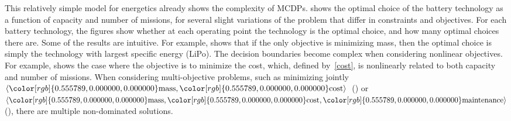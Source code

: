 \documentclass[twocolumn,english]{IEEEtran}
\theoremstyle{definition}
\theoremstyle{plain}
\theoremstyle{definition}
\theoremstyle{remark}
\theoremstyle{definition}
\theoremstyle{plain}
\theoremstyle{plain}
\newcommand{\colR}{\color[rgb]{0.555789,0.000000,0.000000}}
\newcommand{\colF}{\color[rgb]{0.094869,0.500000,0.000000}}
\newcommand{\R}[1]{{\colR #1}}
\newcommand{\F}[1]{{\colF #1}}
\begin{document}
This relatively simple model for energetics already shows the complexity
of MCDPs.  shows the optimal choice of the battery
technology as a function of capacity and number of missions, for several
slight variations of the problem that differ in constraints and objectives.
For each battery technology, the figures show whether at each operating
point the technology is the optimal choice, and how many optimal choices
there are. Some of the results are intuitive. For example, 
shows that if the only objective is minimizing \R{mass}, then the
optimal choice is simply the technology with largest specific energy
(LiPo). The decision boundaries become complex when considering nonlinear
objectives. For example,  shows the case where the
objective is to minimize the \R{cost}, which, defined by~\eqref{cost},
is nonlinearly related to both \F{capacity} and \F{number of missions}.
When considering multi-objective problems, such as minimizing jointly
$\left\langle \R{\text{mass}},\R{\text{cost}}\right\rangle $~()
or~$\left\langle \R{\text{mass}},\R{\text{cost}},\R{\text{maintenance}}\right\rangle $
(), there are multiple non-dominated solutions.
\end{document}
